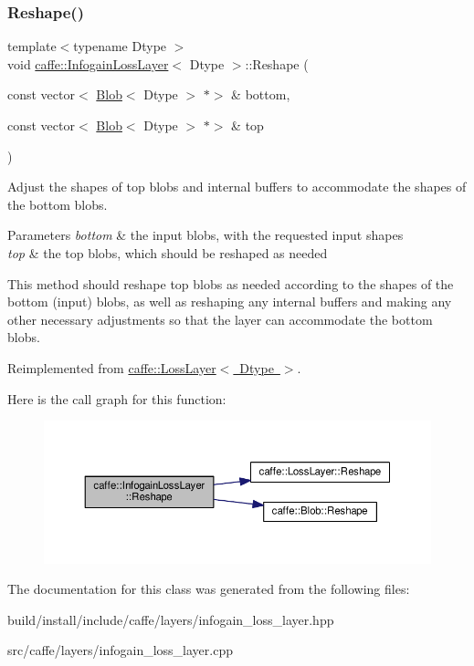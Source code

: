 \subsubsection{\texorpdfstring{Reshape()}{Reshape()}\hspace{0.1cm}{\footnotesize\ttfamily [2/2]}}
{\footnotesize\ttfamily template$<$typename Dtype $>$ \\
void \mbox{\hyperlink{classcaffe_1_1_infogain_loss_layer}{caffe\+::\+Infogain\+Loss\+Layer}}$<$ Dtype $>$\+::Reshape (\begin{DoxyParamCaption}\item[{const vector$<$ \mbox{\hyperlink{classcaffe_1_1_blob}{Blob}}$<$ Dtype $>$ $\ast$$>$ \&}]{bottom,  }\item[{const vector$<$ \mbox{\hyperlink{classcaffe_1_1_blob}{Blob}}$<$ Dtype $>$ $\ast$$>$ \&}]{top }\end{DoxyParamCaption})\hspace{0.3cm}{\ttfamily [virtual]}}



Adjust the shapes of top blobs and internal buffers to accommodate the shapes of the bottom blobs. 


\begin{DoxyParams}{Parameters}
{\em bottom} & the input blobs, with the requested input shapes \\
\hline
{\em top} & the top blobs, which should be reshaped as needed\\
\hline
\end{DoxyParams}
This method should reshape top blobs as needed according to the shapes of the bottom (input) blobs, as well as reshaping any internal buffers and making any other necessary adjustments so that the layer can accommodate the bottom blobs. 

Reimplemented from \mbox{\hyperlink{classcaffe_1_1_loss_layer_abf00412194f5413ea9468ee44b0d986f}{caffe\+::\+Loss\+Layer$<$ Dtype $>$}}.

Here is the call graph for this function\+:
\nopagebreak
\begin{figure}[H]
\begin{center}
\leavevmode
\includegraphics[width=350pt]{classcaffe_1_1_infogain_loss_layer_a83ed478450bc7f629499fed37f654c5c_cgraph}
\end{center}
\end{figure}


The documentation for this class was generated from the following files\+:\begin{DoxyCompactItemize}
\item 
build/install/include/caffe/layers/infogain\+\_\+loss\+\_\+layer.\+hpp\item 
src/caffe/layers/infogain\+\_\+loss\+\_\+layer.\+cpp\end{DoxyCompactItemize}
